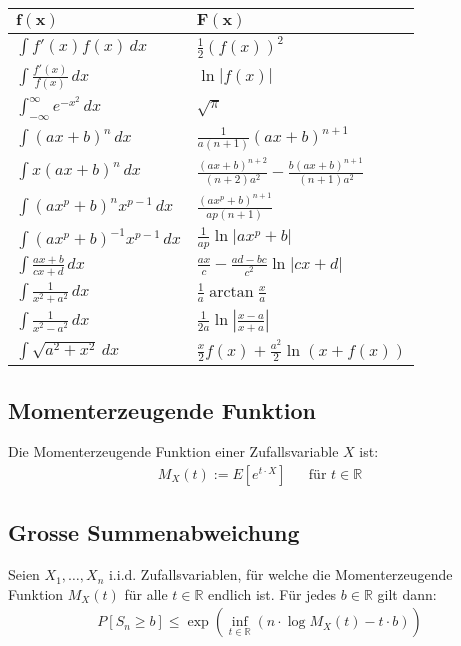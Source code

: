 \documentclass[8pt]{extarticle}
\newcommand{\R}{\mathbb{R}}
\newcommand{\zufallsvariablen}{X_1, \dots, X_n}
\begin{document}
\begin{multicols*}{3}
\begin{center}
  \begin{tabularx}{\linewidth}{>{\centering\arraybackslash}X>{\centering\arraybackslash}X}
    $\mathbf{f(x)}$ & $\mathbf{F(x)}$ \\
    \midrule
    $\int f'(x) f(x) \, dx$ & $\frac{1}{2}(f(x))^2$ \\
    $\int \frac{f'(x)}{f(x)} \, dx$ & $\ln|f(x)|$ \\
    $\int_{-\infty}^\infty e^{-x^2} \, dx$ & $\sqrt{\pi}$ \\
    $\int (ax+b)^n \, dx$ & $\frac{1}{a(n+1)}(ax+b)^{n+1}$ \\
    $\int x(ax+b)^n \, dx$ & $\frac{(ax+b)^{n+2}}{(n+2)a^2} - \frac{b(ax+b)^{n+1}}{(n+1)a^2}$ \\
    $\int (ax^p+b)^n x^{p-1} \, dx$ & $\frac{(ax^p+b)^{n+1}}{ap(n+1)}$ \\
    $\int (ax^p + b)^{-1} x^{p-1} \, dx$ & $\frac{1}{ap} \ln |ax^p + b|$ \\
    $\int \frac{ax+b}{cx+d} \, dx$ & $\frac{ax}{c} - \frac{ad-bc}{c^2} \ln |cx +d|$ \\
    $\int \frac{1}{x^2+a^2} \, dx$ & $\frac{1}{a} \arctan \frac{x}{a}$ \\
    $\int \frac{1}{x^2 - a^2} \, dx$ & $\frac{1}{2a} \ln\left| \frac{x-a}{x+a} \right|$ \\
    $\int \sqrt{a^2+x^2} \, dx $ & $\frac{x}{2}f(x) + \frac{a^2}{2}\ln(x+f(x))$ \\
    \bottomrule
  \end{tabularx}
\end{center}


  \subsection*{Momenterzeugende Funktion}
  Die Momenterzeugende Funktion einer Zufallsvariable $X$ ist:
  \begin{align*}
    M_X (t) := E[e^{t \cdot X}] &  & \text{für } t \in \R
  \end{align*}
  \subsection*{Grosse Summenabweichung}
  Seien $\zufallsvariablen$ i.i.d. Zufallsvariablen, für welche die
  Momenterzeugende Funktion $M_X (t)$ für alle $t \in \R$ endlich ist. Für jedes
  $b \in \R$ gilt dann:
  \begin{align*}
    P[S_n \geq b] \leq \exp \left( \inf_{t \in \R}  ( n \cdot \log M_X (t) - t \cdot b ) \right)
  \end{align*}

\end{multicols*}
\end{document}
